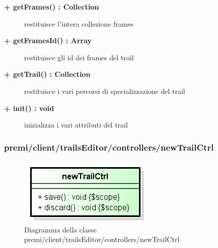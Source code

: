 \begin{description}
	\begin{description}
		\item[\textbf{\color{blue}+ getFrames() : Collection		}] \hfill
			restituisce l'intera collezione frames
	\end{description}
	
	\begin{description}
		\item[\textbf{\color{blue}+ getFramesId() : Array		}] \hfill
			restituisce gli id dei frames del trail 
	\end{description}
	
	\begin{description}
		\item[\textbf{\color{blue}+ getTrail() : Collection		}] \hfill
			restituisce i vari percorsi di specializzazione del trail
	\end{description}
	
	\begin{description}
		\item[\textbf{\color{blue}+ init() : void		}] \hfill
			inizializza i vari attributi del trail
	\end{description}
		
\end{description}	
	
	
	
	
	
	
	
	
	
	
\subsubsection{premi/client/trailsEditor/controllers/newTrailCtrl}
\begin{figure}[H]
\begin{center}
\includegraphics[scale=0.95]{img/diacla/newTrailCtrl.png}
\caption{Diagramma della classe premi/client/trailsEditor/controllers/newTrailCtrl}
\end{center}
\end{figure}


